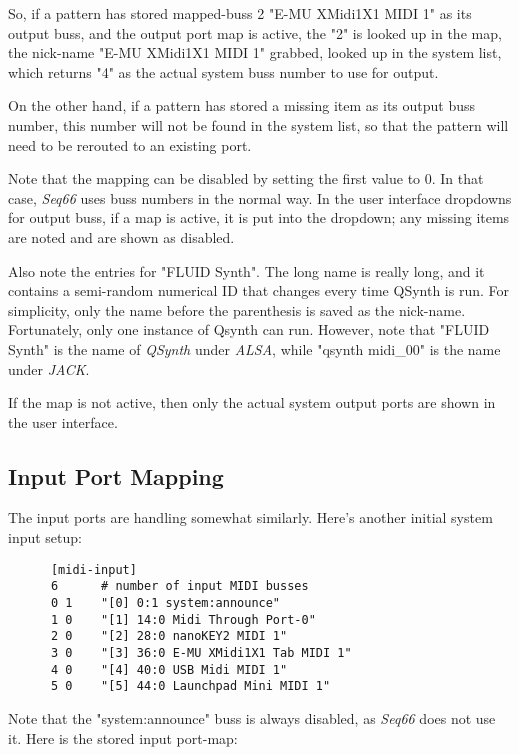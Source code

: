    So, if a pattern has stored mapped-buss 2 "E-MU XMidi1X1 MIDI 1"
   as its output buss,
   and the output port map is active, the "2" is looked up in the map, the
   nick-name "E-MU XMidi1X1 MIDI 1" grabbed,
   looked up in the system list, which
   returns "4" as the actual system buss number to use for output.

   On the other hand, if a pattern has stored a missing item as its output
   buss number, this number will not be found in the system list, so that the
   pattern will need to be rerouted to an existing port.

   Note that the mapping can be disabled by setting the first value to 0.  In
   that case, \textsl{Seq66} uses buss numbers in the normal way.
   In the user interface dropdowns for output buss, if a map is active, it is
   put into the dropdown; any missing items are noted and are shown as
   disabled.

   Also note the entries for "FLUID Synth".  The long name is really long, and
   it contains a semi-random numerical ID that changes every time QSynth is run.
   For simplicity, only the name before the parenthesis is saved as the
   nick-name.  Fortunately, only one instance of Qsynth can run.
   However, note that "FLUID Synth" is the name of
   \textsl{QSynth} under \textsl{ALSA},
   while "qsynth midi\_00" is the name under \textsl{JACK}.  

   If the map is not active, then only the actual system output ports are
   shown in the user interface.

\subsection{Input Port Mapping}
\label{subsec:input_port_mapping}

   The input ports are handling somewhat similarly.  Here's another
   initial system input setup:

   \begin{verbatim}
      [midi-input]
      6      # number of input MIDI busses
      0 1    "[0] 0:1 system:announce"
      1 0    "[1] 14:0 Midi Through Port-0"
      2 0    "[2] 28:0 nanoKEY2 MIDI 1"
      3 0    "[3] 36:0 E-MU XMidi1X1 Tab MIDI 1"
      4 0    "[4] 40:0 USB Midi MIDI 1"
      5 0    "[5] 44:0 Launchpad Mini MIDI 1"
   \end{verbatim}

   Note that the "system:announce" buss is always disabled, as \textsl{Seq66}
   does not use it.  Here is the stored input port-map:

